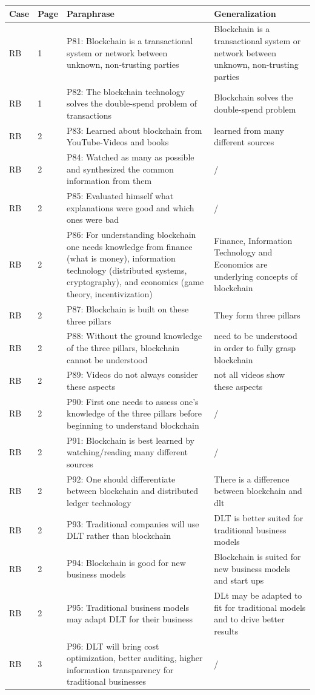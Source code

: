\begin{table}[H]
    \centering
    \begin{tabularx}{\textwidth}{ll|X|p{4.5cm}}
	Case & Page & Paraphrase & Generalization \\ \hline
	RB & 1 & P81: Blockchain is a transactional system or network between unknown, non-trusting parties & Blockchain is a transactional system or network between unknown, non-trusting parties \\
	RB & 1 & P82: The blockchain technology solves the double-spend problem of transactions & Blockchain solves the double-spend problem \\ 
	RB & 2 & P83: Learned about blockchain from YouTube-Videos and books & learned from many different sources \\ 
	RB & 2 & P84: Watched as many as possible and synthesized the common information from them & /  \\
	RB & 2 & P85: Evaluated himself what explanations were good and which ones were bad & / \\ 
	RB & 2 & P86: For understanding blockchain one needs knowledge from finance (what is money), information technology (distributed systems, cryptography), and economics (game theory, incentivization) & Finance, Information Technology and Economics are underlying concepts of blockchain  \\  
	RB & 2 & P87: Blockchain is built on these three pillars & They form three pillars  \\  
	RB & 2 & P88: Without the ground knowledge of the three pillars, blockchain cannot be understood & need to be understood in order to fully grasp blockchain \\
	RB & 2 & P89: Videos do not always consider these aspects & not all videos show these aspects  \\
	RB & 2 & P90: First one needs to assess one's knowledge of the three pillars before beginning to understand blockchain & /  \\ 
	RB & 2 & P91: Blockchain is best learned by watching/reading many different sources & / \\
	RB & 2 & P92: One should differentiate between blockchain and distributed ledger technology & There is a difference between blockchain and dlt  \\
	RB & 2 & P93: Traditional companies will use DLT rather than blockchain & DLT is better suited for traditional business models   \\ 
	RB & 2 & P94: Blockchain is good for new business models & Blockchain is suited for new business models and start ups   \\  
	RB & 2 & P95: Traditional business models may adapt DLT for their business & DLt may be adapted to fit for traditional models and to drive better results   \\  
	RB & 3 & P96: DLT will bring cost optimization, better auditing, higher information transparency for traditional businesses & / \\
	\end{tabularx}
\end{table}

